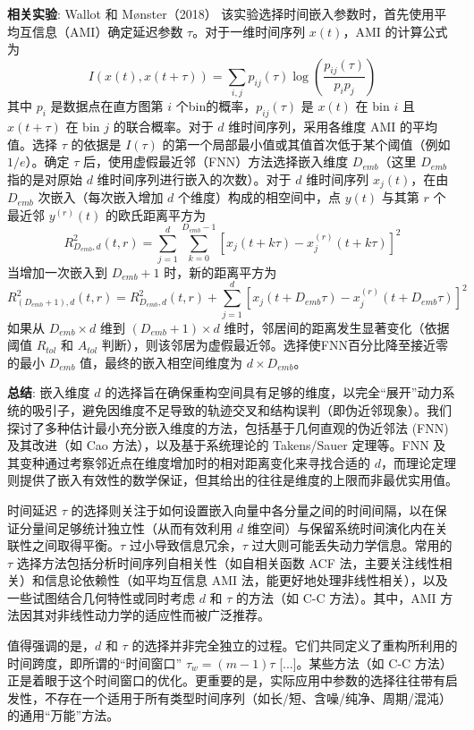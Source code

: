 \textbf{相关实验}: Wallot 和 Mønster（2018）\cite{wallot2018calculation} 该实验选择时间嵌入参数时，首先使用平均互信息（AMI）确定延迟参数 $\tau$。对于一维时间序列 $x(t)$，AMI 的计算公式为
$$I(x(t),x(t+\tau))=\sum_{i,j}p_{ij}(\tau)\log\left(\frac{p_{ij}(\tau)}{p_{i}p_{j}}\right)$$
其中 $p_i$ 是数据点在直方图第 $i$ 个bin的概率，$p_{ij}(\tau)$ 是 $x(t)$ 在 bin $i$ 且 $x(t+\tau)$ 在 bin $j$ 的联合概率。对于 $d$ 维时间序列，采用各维度 AMI 的平均值。选择 $\tau$ 的依据是 $I(\tau)$ 的第一个局部最小值或其值首次低于某个阈值（例如 $1/e$）。确定 $\tau$ 后，使用虚假最近邻（FNN）方法选择嵌入维度 $D_{emb}$（这里 $D_{emb}$ 指的是对原始 $d$ 维时间序列进行嵌入的次数）。对于 $d$ 维时间序列 $x_j(t)$，在由 $D_{emb}$ 次嵌入（每次嵌入增加 $d$ 个维度）构成的相空间中，点 $y(t)$ 与其第 $r$ 个最近邻 $y^{(r)}(t)$ 的欧氏距离平方为
$$R_{D_{emb},d}^{2}(t,r)=\sum_{j=1}^{d}\sum_{k=0}^{D_{emb}-1}[x_{j}(t+k\tau)-x_{j}^{(r)}(t+k\tau)]^{2}$$
当增加一次嵌入到 $D_{emb}+1$ 时，新的距离平方为
$$R_{(D_{emb}+1),d}^{2}(t,r)=R_{D_{emb},d}^{2}(t,r)+\sum_{j=1}^{d}[x_{j}(t+D_{emb}\tau)-x_{j}^{(r)}(t+D_{emb}\tau)]^{2}$$
如果从 $D_{emb} \times d$ 维到 $(D_{emb}+1) \times d$ 维时，邻居间的距离发生显著变化（依据阈值 $R_{tol}$ 和 $A_{tol}$ 判断），则该邻居为虚假最近邻。选择使FNN百分比降至接近零的最小 $D_{emb}$ 值，最终的嵌入相空间维度为 $d \times D_{emb}$。

\textbf{总结}: 
嵌入维度 $d$ 的选择旨在确保重构空间具有足够的维度，以完全“展开”动力系统的吸引子，避免因维度不足导致的轨迹交叉和结构误判（即伪近邻现象）。我们探讨了多种估计最小充分嵌入维度的方法，包括基于几何直观的伪近邻法 (FNN) 及其改进（如 Cao 方法），以及基于系统理论的 Takens/Sauer 定理等。FNN 及其变种通过考察邻近点在维度增加时的相对距离变化来寻找合适的 $d$，而理论定理则提供了嵌入有效性的数学保证，但其给出的往往是维度的上限而非最优实用值。

时间延迟 $\tau$ 的选择则关注于如何设置嵌入向量中各分量之间的时间间隔，以在保证分量间足够统计独立性（从而有效利用 $d$ 维空间）与保留系统时间演化内在关联性之间取得平衡。$\tau$ 过小导致信息冗余，$\tau$ 过大则可能丢失动力学信息。常用的 $\tau$ 选择方法包括分析时间序列自相关性（如自相关函数 ACF 法，主要关注线性相关）和信息论依赖性（如平均互信息 AMI 法，能更好地处理非线性相关），以及一些试图结合几何特性或同时考虑 $d$ 和 $\tau$ 的方法（如 C-C 方法）。其中，AMI 方法因其对非线性动力学的适应性而被广泛推荐。

值得强调的是，$d$ 和 $\tau$ 的选择并非完全独立的过程。它们共同定义了重构所利用的时间跨度，即所谓的“时间窗口” $\tau_w = (m-1)\tau$ [...]。某些方法（如 C-C 方法）正是着眼于这个时间窗口的优化。更重要的是，实际应用中参数的选择往往带有启发性，不存在一个适用于所有类型时间序列（如长/短、含噪/纯净、周期/混沌）的通用“万能”方法。

